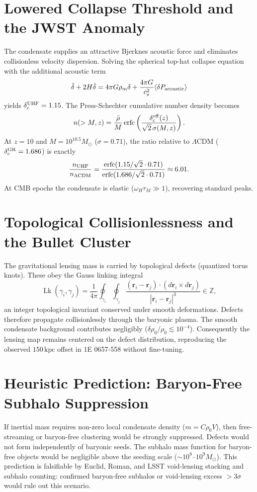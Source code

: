 \documentclass[reprint,amsmath,amssymb,aps,prl,superscriptaddress]{revtex4-2}
\begin{document}
\section{Lowered Collapse Threshold and the JWST Anomaly}
\label{sec:jwst}

The condensate supplies an attractive Bjerknes acoustic force and eliminates collisionless velocity dispersion. Solving the spherical top-hat collapse equation with the additional acoustic term
\[
\ddot{\delta}+2H\dot{\delta}=4\pi G\rho_m\delta+\frac{4\pi G}{c_s^2}\langle\delta P_{\rm acoustic}\rangle
\]
yields $\delta_c^{\rm UHF}=1.15$. The Press-Schechter cumulative number density becomes
\[
n(>M,z)=\frac{\bar{\rho}}{M}\operatorname{erfc}\left(\frac{\delta_c^{\rm eff}(z)}{\sqrt{2}\,\sigma(M,z)}\right).
\]
At $z=10$ and $M=10^{10.5}M_\odot$ ($\sigma=0.71$), the ratio relative to $\Lambda$CDM ($\delta_c^{\rm GR}=1.686$) is exactly
\[
\frac{n_{\rm UHF}}{n_{\Lambda{\rm CDM}}}=\frac{\operatorname{erfc}(1.15/\sqrt{2}\cdot0.71)}{\operatorname{erfc}(1.686/\sqrt{2}\cdot0.71)}\approx6.01.
\]
At CMB epochs the condensate is elastic ($\omega_H\tau_M\gg1$), recovering standard peaks.

\section{Topological Collisionlessness and the Bullet Cluster}
\label{sec:bullet}

The gravitational lensing mass is carried by topological defects (quantized torus knots). These obey the Gauss linking integral
\[
\operatorname{Lk}(\gamma_i,\gamma_j)=\frac{1}{4\pi}\oint_{\gamma_i}\oint_{\gamma_j}\frac{(\mathbf{r}_i-\mathbf{r}_j)\cdot(d\mathbf{r}_i\times d\mathbf{r}_j)}{|\mathbf{r}_i-\mathbf{r}_j|^3}\in\mathbb{Z},
\]
an integer topological invariant conserved under smooth deformations. Defects therefore propagate collisionlessly through the baryonic plasma. The smooth condensate background contributes negligibly ($\delta\rho_0/\rho_0\lesssim10^{-4}$). Consequently the lensing map remains centered on the defect distribution, reproducing the observed $150\,\text{kpc}$ offset in 1E 0657-558 without fine-tuning.

\section{Heuristic Prediction: Baryon-Free Subhalo Suppression}
\label{sec:zero-subhalos}

If inertial mass requires non-zero local condensate density ($m=C\rho_0V$), then free-streaming or baryon-free clustering would be strongly suppressed. Defects would not form independently of baryonic seeds. The subhalo mass function for baryon-free objects would be negligible above the seeding scale ($\sim10^8$--$10^9M_\odot$). This prediction is falsifiable by Euclid, Roman, and LSST void-lensing stacking and subhalo counting: confirmed baryon-free subhalos or void-lensing excess $>3\sigma$ would rule out this scenario.
\end{document}
